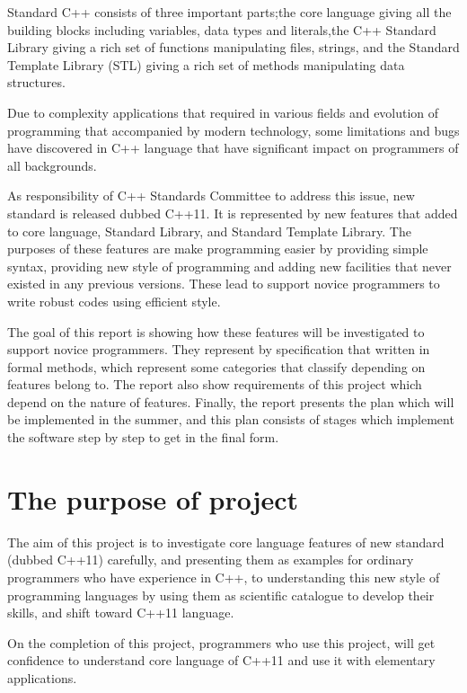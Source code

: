 \documentclass[12pt]{report}
\begin{document}
Standard C++ consists of three important parts;the core language giving all the building blocks including variables, data types and literals,the C++ Standard Library giving a rich set of functions manipulating files, strings, and the Standard Template Library (STL) giving a rich set of methods manipulating data structures.

Due to complexity applications  that required in various fields and evolution of programming that  accompanied by modern technology, some limitations and bugs have discovered in C++ language that have significant impact on programmers of all backgrounds.

As responsibility of C++ Standards Committee to address this issue, new standard is released dubbed C++11. It is represented by new features that added to core language, Standard  Library, and Standard Template Library. The purposes of these features are make programming easier by providing simple syntax, providing new style of programming and adding new facilities that never existed in any previous versions. These lead to support novice programmers to write robust codes using efficient style.

The goal of this report is showing how these features will be investigated to support novice programmers. They represent by specification that written in formal methods, which represent some categories that  classify depending on features belong to. The report also show requirements of this project which depend on the nature of features. Finally, the report presents the plan which will be implemented in the summer, and this plan consists of stages which implement the software step by step to get in the final form.


\section{The purpose of project}
\label{section:The purpose of project}
The aim of this project is to investigate core language  features of new standard (dubbed C++11) carefully, and presenting them as examples for ordinary programmers who have experience in C++, to understanding this new style of programming languages by using them as scientific  catalogue to develop their skills, and shift toward C++11 language.

On the completion of this project, programmers who use this project, will get confidence to understand core language of  C++11 and use it with elementary applications.
\end{document}
